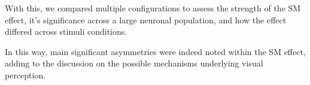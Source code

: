 With this, we compared multiple configurations to assess the strength of the SM effect, it's significance across a large neuronal population, and how the effect differed across stimuli conditions.

%
%
%
%
%
%

In this way, main significant asymmetries were indeed noted within the SM effect, adding to the discussion on the possible mechanisms underlying visual perception.

